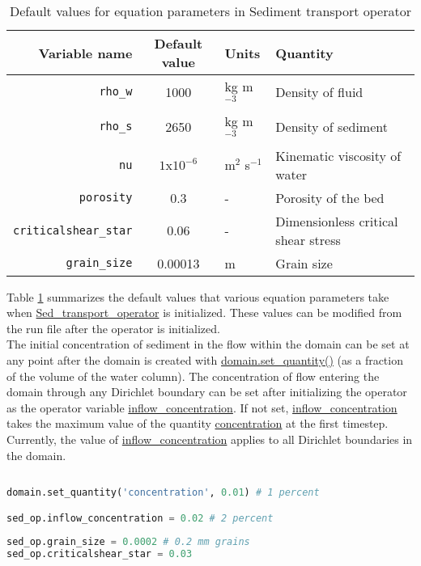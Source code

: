\documentclass[10pt]{article}
\newcommand{\ra}[1]{\renewcommand{\arraystretch}{#1}}
\begin{document}
\begin{table}[h]
\centering
\ra{1.3}
\begin{tabular}{@{}rcll@{}}
\toprule
Variable name & Default value & Units & Quantity  \\ \midrule
\verb!rho_w! & 1000 & kg m$^{-3}$ & Density of fluid  \\
\verb!rho_s! & 2650 & kg m$^{-3}$ & Density of sediment \\
\verb!nu!         &  $1$x${10}^{-6}$    &   m$^2$ s$^{-1}$          &   Kinematic viscosity of water       \\
\verb!porosity!         &   0.3   &     -        & Porosity of the bed  \\
\verb!criticalshear_star!         &   0.06   &     -        & Dimensionless critical shear stress    \\
\verb!grain_size!         &   0.00013   &     m        & Grain size       \\
\bottomrule
\end{tabular}
\caption{Default values for equation parameters in Sediment transport operator}
\label{table:sed_transport_parameters}
\end{table}

Table \ref{table:sed_transport_parameters} summarizes the default values that various equation parameters take when \url{Sed_transport_operator} is initialized. These values can be modified from the run file after the operator is initialized.
\ \\

The initial concentration of sediment in the flow within the domain can be set at any point after the domain is created with \url{domain.set_quantity()} (as a fraction of the volume of the water column). The concentration of flow entering the domain through any Dirichlet boundary can be set after initializing the operator as the operator variable \url{inflow_concentration}. If not set, \url{inflow_concentration} takes the maximum value of the quantity \url{concentration} at the first timestep. Currently, the value of \url{inflow_concentration} applies to all Dirichlet boundaries in the domain.

\begin{minipage}[c]{0.95\textwidth}
\begin{lstlisting}[language=Python, title=Modifying parameter values]
 
domain.set_quantity('concentration', 0.01) # 1 percent

sed_op.inflow_concentration = 0.02 # 2 percent
 
sed_op.grain_size = 0.0002 # 0.2 mm grains
sed_op.criticalshear_star = 0.03

\end{lstlisting}
\end{minipage}
\ \\
\end{document}
